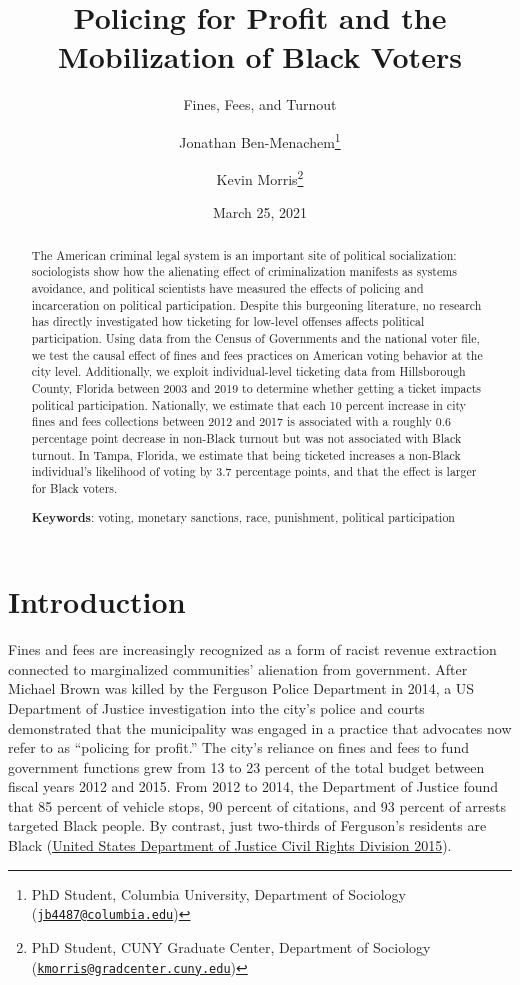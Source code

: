 \documentclass[
  12pt,
]{article}
\title{Policing for Profit and the Mobilization of Black Voters}
\subtitle{Fines, Fees, and Turnout}
\author{Jonathan Ben-Menachem\footnote{PhD Student, Columbia University, Department of Sociology (\href{mailto:jb4487@columbia.edu}{\nolinkurl{jb4487@columbia.edu}})} \and Kevin Morris\footnote{PhD Student, CUNY Graduate Center, Department of Sociology (\href{mailto:kmorris@gradcenter.cuny.edu}{\nolinkurl{kmorris@gradcenter.cuny.edu}})}}
\date{March 25, 2021}
\begin{document}
\maketitle
\begin{abstract}
The American criminal legal system is an important site of political socialization: sociologists show how the alienating effect of criminalization manifests as systems avoidance, and political scientists have measured the effects of policing and incarceration on political participation. Despite this burgeoning literature, no research has directly investigated how ticketing for low-level offenses affects political participation. Using data from the Census of Governments and the national voter file, we test the causal effect of fines and fees practices on American voting behavior at the city level. Additionally, we exploit individual-level ticketing data from Hillsborough County, Florida between 2003 and 2019 to determine whether getting a ticket impacts political participation. Nationally, we estimate that each 10 percent increase in city fines and fees collections between 2012 and 2017 is associated with a roughly 0.6 percentage point decrease in non-Black turnout but was not associated with Black turnout. In Tampa, Florida, we estimate that being ticketed increases a non-Black individual's likelihood of voting by 3.7 percentage points, and that the effect is larger for Black voters.

\hfill\break

\textbf{Keywords}: voting, monetary sanctions, race, punishment, political participation
\end{abstract}

\pagebreak

\doublespacing

\hypertarget{introduction}{%
\section*{Introduction}\label{introduction}}

Fines and fees are increasingly recognized as a form of racist revenue extraction connected to marginalized communities' alienation from government. After Michael Brown was killed by the Ferguson Police Department in 2014, a US Department of Justice investigation into the city's police and courts demonstrated that the municipality was engaged in a practice that advocates now refer to as ``policing for profit.'' The city's reliance on fines and fees to fund government functions grew from 13 to 23 percent of the total budget between fiscal years 2012 and 2015. From 2012 to 2014, the Department of Justice found that 85 percent of vehicle stops, 90 percent of citations, and 93 percent of arrests targeted Black people. By contrast, just two-thirds of Ferguson's residents are Black (\protect\hyperlink{ref-UnitedStatesDepartmentofJusticeCivilRightsDivision2015}{United States Department of Justice Civil Rights Division 2015}).
\end{document}
